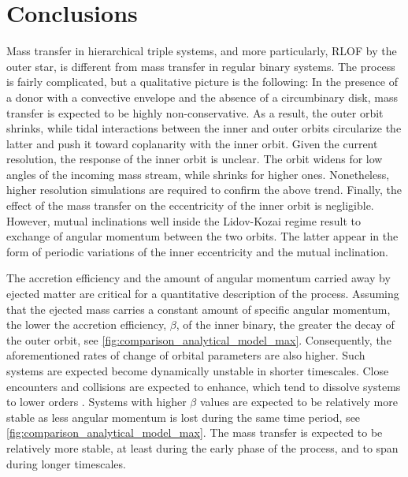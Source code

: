 \section{Conclusions}

Mass transfer in hierarchical triple systems, and more particularly, RLOF by the outer star, is different from mass transfer in regular binary systems. The process is fairly complicated, but a qualitative picture is the following: In the presence of a donor with a convective envelope and the absence of a circumbinary disk, mass transfer is expected to be highly non-conservative. As a result, the outer orbit shrinks, while tidal interactions between the inner and outer orbits circularize the latter and push it toward coplanarity with the inner orbit. Given the current resolution, the response of the inner orbit is unclear. The orbit widens for low angles of the incoming mass stream, while shrinks for higher ones. Nonetheless, higher resolution simulations are required to confirm the above trend. Finally, the effect of the mass transfer on the eccentricity of the inner orbit is negligible. However, mutual inclinations well inside the Lidov-Kozai regime result to exchange of angular momentum between the two orbits. The latter appear in the form of periodic variations of the inner eccentricity and the mutual inclination.

The accretion efficiency and the amount of angular momentum carried away by ejected matter are critical for a quantitative description of the process. Assuming that the ejected mass carries a constant amount of specific angular momentum, the lower the accretion efficiency, $\beta$, of the inner binary, the greater the decay of the outer orbit, see \cref{fig:comparison_analytical_model_max}. Consequently, the aforementioned rates of change of orbital parameters are also higher. Such systems are expected become dynamically unstable in shorter timescales. Close encounters and collisions are expected to enhance, which tend to dissolve systems to lower orders \citep{van2007formation}. Systems with higher $\beta$ values are expected to be relatively more stable as less angular momentum is lost during the same time period, see \cref{fig:comparison_analytical_model_max}. The mass transfer is expected to be relatively more stable, at least during the early phase of the process, and to span during longer timescales.

